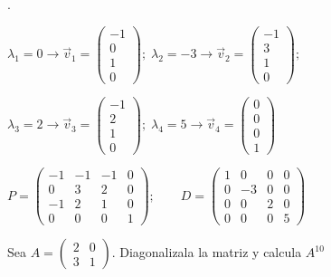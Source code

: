 \begin{proofw}\renewcommand{\qedsymbol}{$\diamond$}.

\noindent $ \lambda_1=0 \longrightarrow \vec v_1=\left( \begin{matrix} -1\\0\\1\\0 \end{matrix}\right); \; \lambda_2=-3 \longrightarrow \vec v_2=\left( \begin{matrix} -1\\3\\1\\0 \end{matrix}\right); \;$

\noindent $\lambda_3=2 \longrightarrow \vec v_3=\left( \begin{matrix} -1\\2\\1\\0 \end{matrix}\right); \; \lambda_4=5 \longrightarrow \vec v_4=\left( \begin{matrix} 0\\0\\0\\1 \end{matrix}\right)$

$P=\left(\begin{matrix} -1&-1&-1&0\\0&3&2&0\\-1&2&1&0 \\ 0&0&0&1  \end{matrix}\right); \qquad D=\left(\begin{matrix} 1&0&0&0\\0&-3&0&0\\0&0&2&0\\0&0&0&5  \end{matrix}\right)$
	
\end{proofw}

\begin{ejre}
	Sea $A=\left( \begin{matrix} 2&0\\3&1 \end{matrix} \right)$. Diagonalizala la matriz y calcula $A^{10}$
\end{ejre}

